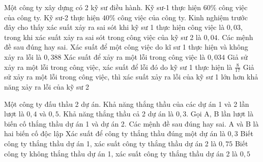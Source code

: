 \begin{ex}%
    Một công ty xây dựng có 2 kỹ sư điều hành. Kỹ sư-1 thực hiện $60\%$ công việc của công ty. Kỹ sư-2 thực hiện $40\%$ công việc của công ty. Kinh nghiệm trước đây cho thấy xác suất xảy ra sai sót khi kỹ sư 1 thực hiện công việc là $0,03$, trong khi xác suất xảy ra sai sót trong công việc của kỹ sư 2 là $0,04$. Các mệnh đề sau đúng hay sai.
    \choiceTF
    { Xác suất để một công việc do kĩ sư 1 thực hiện và không xảy ra lỗi là $0,388$}
    {\True Xác suất để xảy ra một lỗi trong công việc là $0,034$}
    { Giả sử xảy ra một lỗi trong công việc, xác suất để lỗi đó do kỹ sư 1 thực hiện là $\frac{8}{17}$}
    {\True Giả sử xảy ra một lỗi trong công việc, thì xác suất xảy ra lỗi của kỹ sư 1 lớn hơn khả năng xảy ra lỗi của kỹ sư 2}
\end{ex}
\begin{ex}%
    Một công ty đấu thầu 2 dự án. Khả năng thắng thầu của các dự án 1 và 2 lần lượt là $0,4$ và $0,5$. Khả năng thắng thầu cả 2 dự án là $0,3$. Gọi A, B lần lượt là biến cố thắng thầu dự án 1 và dự án 2. Các mệnh đề sau đúng hay sai.
    \choiceTF
    { A và B là hai biến cố độc lập}
    {\True Xác suất để công ty thắng thầu đúng một dự án là $0,3$}
    {\True Biết công ty thắng thầu dự án 1, xác suất công ty thắng thầu dự án 2 là $0,75$}
    { Biết công ty không thắng thầu dự án 1, xác suất công ty thắng thầu dự án 2 là $0,5$}
\end{ex}
